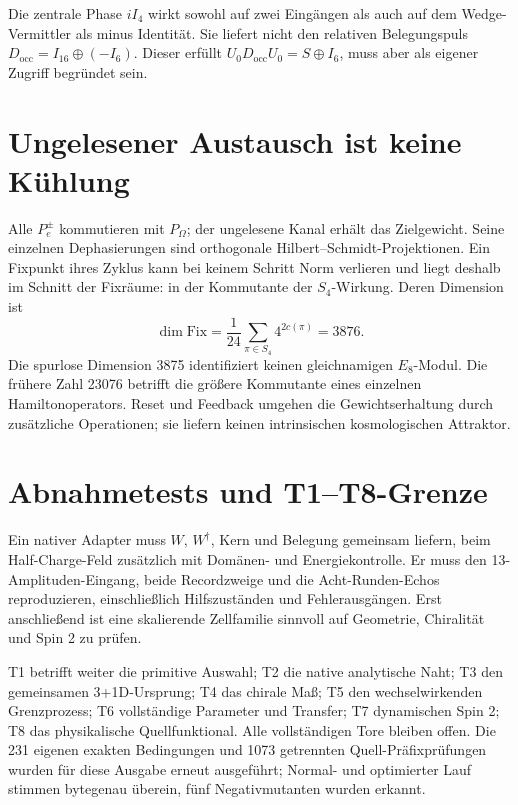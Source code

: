 Die zentrale Phase $iI_4$ wirkt sowohl auf zwei Eingängen als auch auf dem Wedge-Vermittler als minus Identität. Sie liefert nicht den relativen Belegungspuls $D_{\mathrm{occ}}=I_{16}\oplus(-I_6)$. Dieser erfüllt $U_0D_{\mathrm{occ}}U_0=S\oplus I_6$, muss aber als eigener Zugriff begründet sein.

\section{Ungelesener Austausch ist keine Kühlung}
Alle $P^\pm_e$ kommutieren mit $P_\Omega$; der ungelesene Kanal erhält das Zielgewicht. Seine einzelnen Dephasierungen sind orthogonale Hilbert--Schmidt-Projektionen. Ein Fixpunkt ihres Zyklus kann bei keinem Schritt Norm verlieren und liegt deshalb im Schnitt der Fixräume: in der Kommutante der $S_4$-Wirkung. Deren Dimension ist
\begin{equation}
\dim\mathrm{Fix}=\frac1{24}\sum_{\pi\in S_4}4^{2c(\pi)}=3876.
\end{equation}
Die spurlose Dimension 3875 identifiziert keinen gleichnamigen $E_8$-Modul. Die frühere Zahl 23076 betrifft die größere Kommutante eines einzelnen Hamiltonoperators. Reset und Feedback umgehen die Gewichtserhaltung durch zusätzliche Operationen; sie liefern keinen intrinsischen kosmologischen Attraktor.

\section{Abnahmetests und T1--T8-Grenze}
Ein nativer Adapter muss $W$, $W^\dagger$, Kern und Belegung gemeinsam liefern, beim Half-Charge-Feld zusätzlich mit Domänen- und Energiekontrolle. Er muss den 13-Amplituden-Eingang, beide Recordzweige und die Acht-Runden-Echos reproduzieren, einschließlich Hilfszuständen und Fehlerausgängen. Erst anschließend ist eine skalierende Zellfamilie sinnvoll auf Geometrie, Chiralität und Spin 2 zu prüfen.

T1 betrifft weiter die primitive Auswahl; T2 die native analytische Naht; T3 den gemeinsamen 3+1D-Ursprung; T4 das chirale Maß; T5 den wechselwirkenden Grenzprozess; T6 vollständige Parameter und Transfer; T7 dynamischen Spin 2; T8 das physikalische Quellfunktional. Alle vollständigen Tore bleiben offen. Die 231 eigenen exakten Bedingungen und 1073 getrennten Quell-Präfixprüfungen wurden für diese Ausgabe erneut ausgeführt; Normal- und optimierter Lauf stimmen bytegenau überein, fünf Negativmutanten wurden erkannt.
